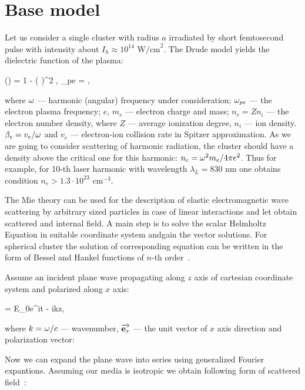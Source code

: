 \section{Base model}

Let us consider a single cluster with radius $a$ irradiated by short femtosecond pulse with intensity about $I_{h} \approx 10^{14}$ $\textrm{W/cm}^2$. The Drude model yields the dielectric function of the plasma:

    \eq
		\varepsilon (\w) = 1 - \left(  \right)^2 , \qquad \w_{pe} = ,
		\label{eps_plasma}
	\qe

\noindent where $\omega$ --- harmonic (angular) frequency under consideration; $\omega_{pe}$ --- the electron plasma frequency; $e$, $m_e$ --- electron charge and mass; $n_e = Z n_i$ --- the electron number density, where $Z$ --- average ionization degree, $n_i$ --- ion density. $\beta_{e} = v_e / \omega$ and $v_e$ --- electron-ion collision rate in Spitzer approximation. As we are going to consider scattering of harmonic radiation, the cluster should have a density above the critical one for this harmonic: $n_c = \omega^2 m_e / 4 \pi e^2$. Thus for example, for 10-th laser harmonic with wavelength $\lambda_{L} = 830$ nm one obtains condition $n_e > 1.3 \cdot 10^{23}$ $\textrm{cm}^{-3}$.

The Mie theory can be used for the description of elastic electromagnetic wave scattering by arbitrary sized particles in case of linear interactions and let obtain scattered and internal field. A main step is to solve the scalar Helmholtz Equation in suitable coordinate system andgain the vector solutions. For spherical cluster the solution of corresponding equation can be written in the form of Bessel and Hankel functions of $n$-th order~\cite{boren_huffman}.

Assume an incident plane wave propagating along $z$ axis of cartesian coordinate system and polarized along $x$ axis:

    \eq
         = E_0\:e^{i\w t - ikz}\:,
        \label{E_i_sph}
    \qe

\noindent where $k = \omega/c$ --- wavenumber, $\overrightarrow{\textbf{e}_{x}}$ --- the unit vector of $x$ axis direction and polarization vector:


Now we can expand the plane wave into series using generalized Fourier expantions. Assuming our media is isotropic we obtain following form of scattered field~\cite{boren_huffman}:


